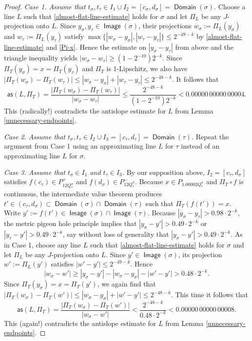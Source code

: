 \documentclass[12pt]{amsart}
\numberwithin{equation}{section}
\theoremstyle{plain}
\theoremstyle{definition}
\newcommand{\Domain}{\mathop\mathsf{Domain}\nolimits}
\newcommand{\Image}{\mathop\mathsf{Image}\nolimits}
\numberwithin{figure}{section}
\begin{document}
\begin{proof}
\emph{Case 1. Assume that $t_\sigma,t_\tau\in I_1\cup I_2=[c_\sigma,d_\sigma]=\Domain(\sigma)$.} Choose a line $L$ such that \eqref{almost-flat-line-estimate} holds for $\sigma$ and let $\Pi_L$ be any $J$-projection onto $L$. Since $y_\sigma,y_\tau\in\Image(\sigma)$, their projections $w_\sigma:=\Pi_L(y_\sigma)$ and $w_\tau:=\Pi_L(y_\tau)$ satisfy $\max\{|w_\sigma-y_\sigma|,|w_\tau-y_\tau|\}\leq 2^{-49-k}$ by \eqref{almost-flat-line-estimate} and \eqref{Pi-x}. Hence the estimate on $|y_\sigma-y_\tau|$ from above and the triangle inequality yields $|w_\sigma-w_\tau|\geq (1-2^{-10})2^{-k}$. Since $\Pi_T(y_\sigma)=x=\Pi_T(y_\tau)$ and $\Pi_T$ is 1-Lipschitz, we also have $|\Pi_T(w_\sigma)-\Pi_T(w_\tau)|\leq |w_\sigma-y_\sigma|+|w_\tau-y_\tau|\leq 2^{-48-k}$. It follows that $$\mathsf{as}(L,\Pi_T) = \frac{|\Pi_T(w_\sigma)-\Pi_T(w_\tau)|}{|w_\sigma-w_\tau|} \leq \frac{2^{-48-k}}{(1-2^{-10})2^{-k}} < 0.00000\,00000\,00004.$$ This (radically!) contradicts the antislope estimate for $L$ from Lemma \ref{unnecessary-endpoints}.

\emph{Case 2. Assume that $t_\sigma,t_\tau\in I_2\cup I_3=[c_\tau,d_\tau]=\Domain(\tau)$.} Repeat the argument from Case 1 using an approximating line $L$ for $\tau$ instead of an approximating line $L$ for $\sigma$.

\emph{Case 3. Assume that $t_\sigma\in I_1$ and $t_\tau\in I_3$.} By our supposition above, $I_2=[c_\tau,d_\sigma]$ satisfies $f(c_\tau)\in P_{12Q^\sigma_*}^+$ and $f(d_\sigma)\in P_{12Q^\sigma_*}^-$. Because $x\in P_{1.00002Q^\sigma_*}$ and $\Pi_T\circ f$ is continuous, the intermediate value theorem produces $t'\in (c_\tau,d_\sigma)\subset \Domain(\sigma)\cap\Domain(\tau)$ such that $\Pi_T(f(t'))=x$. Write $y':=f(t')\in\Image(\sigma)\cap\Image(\tau)$. Because  $|y_\sigma-y_\tau|>0.98\cdot 2^{-k}$, the metric pigeon hole principle implies that $|y_\sigma-y'|>0.49\cdot 2^{-k}$ or $|y_\tau-y'|>0.49\cdot 2^{-k}$, say without loss of generality that $|y_\sigma-y'|>0.49\cdot 2^{-k}$. As in Case 1, choose any line $L$ such that \eqref{almost-flat-line-estimate} holds for $\sigma$ and let $\Pi_L$ be any $J$-projection onto $L$. Since $y'\in\Image(\sigma)$, its projection $w':=\Pi_L(y')$ satisfies $|w'-y'|\leq 2^{-49-k}$. Hence $$|w_\sigma-w'|\geq |y_\sigma-y'|-|w_\sigma-y_\sigma|-|w'-y'|>0.48\cdot 2^{-k}.$$ Since $\Pi_T(y_\sigma)=x=\Pi_T(y')$, we again find that $|\Pi_T(w_\sigma)-\Pi_T(w')|\leq |w_\sigma-y_\sigma|+|w'-y'|\leq 2^{-48-k}$. This time it follows that $$\mathsf{as}(L,\Pi_T) = \frac{|\Pi_T(w_\sigma)-\Pi_T(w')|}{|w_\sigma-w'|} < \frac{2^{-48-k}}{0.48\cdot 2^{-k}} < 0.00000\,00000\,00008.$$ This (again!) contradicts the antislope estimate for $L$ from Lemma \ref{unnecessary-endpoints}.
\end{proof}
\end{document}
